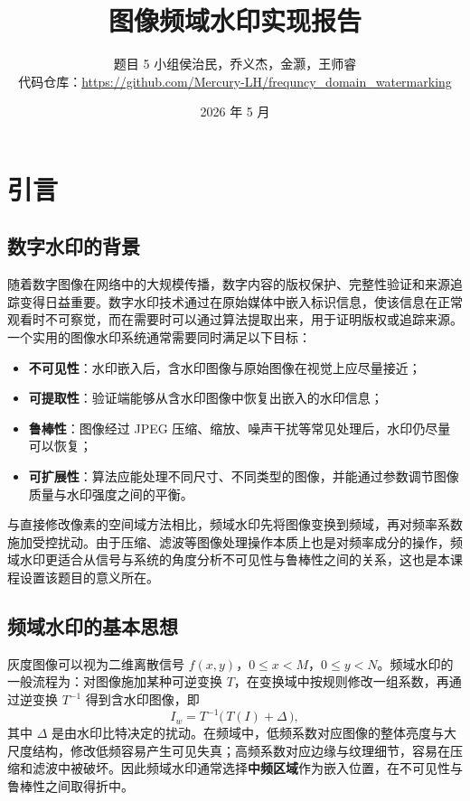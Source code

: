 \documentclass[11pt]{ctexart}
\title{\textbf{图像频域水印实现报告}}
\author{题目 5 小组\quad 侯治民，乔义杰，金灏，王师睿\\[6pt]
\normalsize 代码仓库：\url{https://github.com/Mercury-LH/frequncy_domain_watermarking}}
\date{2026 年 5 月}
\begin{document}
\pagestyle{plain}

\maketitle

\section{引言}

\subsection{数字水印的背景}

随着数字图像在网络中的大规模传播，数字内容的版权保护、完整性验证和来源追踪变得日益重要。数字水印技术通过在原始媒体中嵌入标识信息，使该信息在正常观看时不可察觉，而在需要时可以通过算法提取出来，用于证明版权或追踪来源。一个实用的图像水印系统通常需要同时满足以下目标：

\begin{itemize}
  \item \textbf{不可见性}：水印嵌入后，含水印图像与原始图像在视觉上应尽量接近；
  \item \textbf{可提取性}：验证端能够从含水印图像中恢复出嵌入的水印信息；
  \item \textbf{鲁棒性}：图像经过 JPEG 压缩、缩放、噪声干扰等常见处理后，水印仍尽量可以恢复；
  \item \textbf{可扩展性}：算法应能处理不同尺寸、不同类型的图像，并能通过参数调节图像质量与水印强度之间的平衡。
\end{itemize}

与直接修改像素的空间域方法相比，频域水印先将图像变换到频域，再对频率系数施加受控扰动。由于压缩、滤波等图像处理操作本质上也是对频率成分的操作，频域水印更适合从信号与系统的角度分析不可见性与鲁棒性之间的关系，这也是本课程设置该题目的意义所在。

\subsection{频域水印的基本思想}

灰度图像可以视为二维离散信号 $f(x,y)$，$0 \le x < M$，$0 \le y < N$。频域水印的一般流程为：对图像施加某种可逆变换 $T$，在变换域中按规则修改一组系数，再通过逆变换 $T^{-1}$ 得到含水印图像，即
\begin{equation}
  I_w = T^{-1}\bigl(\, T(I) + \Delta \,\bigr),
  \label{eq:general}
\end{equation}
其中 $\Delta$ 是由水印比特决定的扰动。在频域中，低频系数对应图像的整体亮度与大尺度结构，修改低频容易产生可见失真；高频系数对应边缘与纹理细节，容易在压缩和滤波中被破坏。因此频域水印通常选择\textbf{中频区域}作为嵌入位置，在不可见性与鲁棒性之间取得折中。
\end{document}
